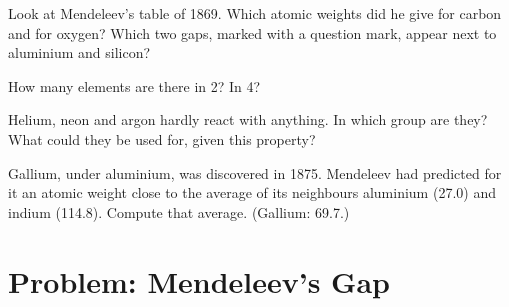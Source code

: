 \begin{exercise}[$\star\star$]\label{exo:g9:periodic-table-first-look:9}
Look at Mendeleev's table of 1869. Which atomic weights did he give for
carbon and for oxygen? Which two gaps, marked with a question mark,
appear next to aluminium and silicon?
\end{exercise}

\begin{exercise}[$\star\star$]\label{exo:g9:periodic-table-first-look:10}
How many elements are there in  2? In  4?
\end{exercise}

\begin{exercise}[$\star\star\star$]\label{exo:g9:periodic-table-first-look:11}
Helium, neon and argon hardly react with anything. In which group are
they? What could they be used for, given this property?
\end{exercise}

\begin{exercise}[$\star\star\star$]\label{exo:g9:periodic-table-first-look:12}
Gallium, under aluminium, was discovered in 1875. Mendeleev had predicted
for it an atomic weight close to the average of its neighbours aluminium
(27.0) and indium (114.8). Compute that average. (Gallium: 69.7.)
\end{exercise}

\section{Problem: Mendeleev's Gap}

